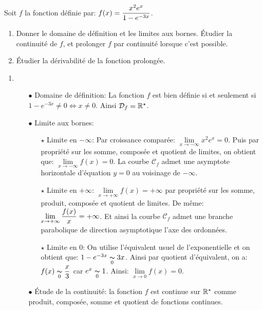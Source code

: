 \documentclass[a4paper, 11pt,reqno]{article}
\begin{document}
\begin{exercice}  \;
	Soit $f$ la fonction d\'efinie par: $f(x)=\displaystyle\frac{x^2e^x}{1-e^{-3x}}$.
	\begin{enumerate}
		\item Donner le domaine de d\'efinition et les limites aux bornes. \'Etudier la continuit\'e de $f$, et prolonger $f$ par continuit\'e lorsque c'est possible.
		\item \'Etudier la d\'erivabilit\'e de la fonction prolong\'ee.
	\end{enumerate}
\end{exercice}
\begin{correction}  \;
	\begin{enumerate}
		\item
		      \begin{itemize}
			      \item[$\bullet$] Domaine de d\'efinition: La fonction $f$ est bien d\'efinie si et seulement si $1-e^{-3x}\not= 0\Leftrightarrow x\not= 0$. Ainsi $\mathcal{D}_f=\mathbb{R}^{\star}$.
			      \item[$\bullet$] Limite aux bornes:
			            \begin{itemize}
				            \item[$\star$] Limite en $-\infty$: Par croissance compar\'ee: $\lim\limits_{x\to -\infty} x^2e^x=0$. Puis par propri\'et\'e sur les somme, compos\'ee et quotient de limites, on obtient que: $\lim\limits_{x\to -\infty} f(x)=0$. La courbe $\mathcal{C}_f$ admet une asymptote horizontale d'\'equation $y=0$ au voisinage de $-\infty$.
				            \item[$\star$] Limite en $+\infty$: $\lim\limits_{x\to +\infty} f(x)=+\infty$ par propri\'et\'e sur les somme, produit, compos\'ee et quotient de limites. De m\^{e}me: $\lim\limits_{x\to +\infty} \displaystyle\frac{f(x)}{x}=+\infty$. Et ainsi la courbe $\mathcal{C}_f$ admet une branche parabolique de direction asymptotique l'axe des ordonn\'ees.
				            \item[$\star$] Limite en 0: On utilise l'\'equivalent usuel de l'exponentielle et on obtient que: $1-e^{-3x}\underset{0}{\thicksim} 3x$. Ainsi par quotient d'\'equivalent, on a: $f(x)\underset{0}{\thicksim}\displaystyle\frac{x}{3}$ car $e^x\underset{0}{\thicksim} 1$. Ainsi: $\lim\limits_{x\to 0} f(x)=0$.
			            \end{itemize}
			      \item[$\bullet$] \'Etude de la continuit\'e: la fonction $f$ est continue sur $\mathbb{R}^{\star}$ comme produit, compos\'ee, somme et quotient de fonctions continues.

\end{itemize}
\end{enumerate}
\end{correction}
\end{document}
